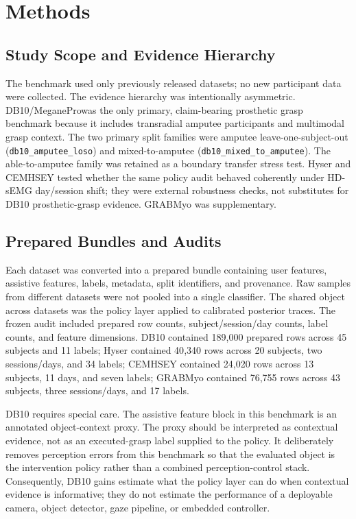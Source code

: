 \documentclass[journal]{IEEEtran}
\newcommand{\dbten}{DB10/MeganePro}
\begin{document}
\section{Methods}
\subsection{Study Scope and Evidence Hierarchy}
The benchmark used only previously released datasets; no new participant data were collected. The evidence hierarchy was intentionally asymmetric. \dbten was the only primary, claim-bearing prosthetic grasp benchmark because it includes transradial amputee participants and multimodal grasp context. The two primary split families were amputee leave-one-subject-out (\texttt{db10\_amputee\_loso}) and mixed-to-amputee (\texttt{db10\_mixed\_to\_amputee}). The able-to-amputee family was retained as a boundary transfer stress test. Hyser and CEMHSEY tested whether the same policy audit behaved coherently under HD-sEMG day/session shift; they were external robustness checks, not substitutes for DB10 prosthetic-grasp evidence. GRABMyo was supplementary.



\subsection{Prepared Bundles and Audits}
Each dataset was converted into a prepared bundle containing user features, assistive features, labels, metadata, split identifiers, and provenance. Raw samples from different datasets were not pooled into a single classifier. The shared object across datasets was the policy layer applied to calibrated posterior traces. The frozen audit included prepared row counts, subject/session/day counts, label counts, and feature dimensions. DB10 contained 189{,}000 prepared rows across 45 subjects and 11 labels; Hyser contained 40{,}340 rows across 20 subjects, two sessions/days, and 34 labels; CEMHSEY contained 24{,}020 rows across 13 subjects, 11 days, and seven labels; GRABMyo contained 76{,}755 rows across 43 subjects, three sessions/days, and 17 labels.

DB10 requires special care. The assistive feature block in this benchmark is an annotated object-context proxy. The proxy should be interpreted as contextual evidence, not as an executed-grasp label supplied to the policy. It deliberately removes perception errors from this benchmark so that the evaluated object is the intervention policy rather than a combined perception-control stack. Consequently, DB10 gains estimate what the policy layer can do when contextual evidence is informative; they do not estimate the performance of a deployable camera, object detector, gaze pipeline, or embedded controller.
\end{document}
